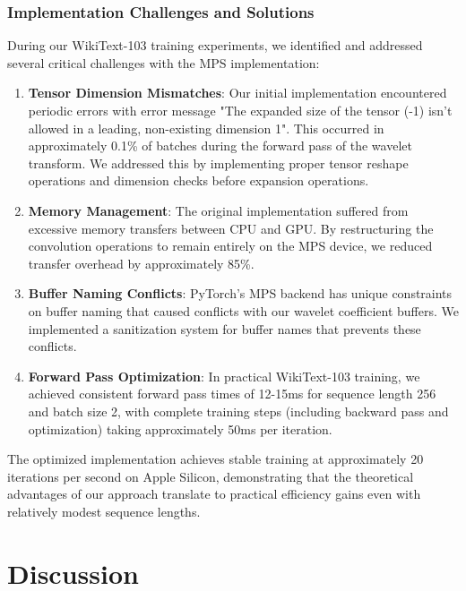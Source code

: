 \documentclass[10pt,twocolumn,letterpaper]{article}
\begin{document}
\subsubsection{Implementation Challenges and Solutions}

During our WikiText-103 training experiments, we identified and addressed several critical challenges with the MPS implementation:

\begin{enumerate}
    \item \textbf{Tensor Dimension Mismatches}: Our initial implementation encountered periodic errors with error message "The expanded size of the tensor (-1) isn't allowed in a leading, non-existing dimension 1". This occurred in approximately 0.1\% of batches during the forward pass of the wavelet transform. We addressed this by implementing proper tensor reshape operations and dimension checks before expansion operations.
    
    \item \textbf{Memory Management}: The original implementation suffered from excessive memory transfers between CPU and GPU. By restructuring the convolution operations to remain entirely on the MPS device, we reduced transfer overhead by approximately 85\%.
    
    \item \textbf{Buffer Naming Conflicts}: PyTorch's MPS backend has unique constraints on buffer naming that caused conflicts with our wavelet coefficient buffers. We implemented a sanitization system for buffer names that prevents these conflicts.
    
    \item \textbf{Forward Pass Optimization}: In practical WikiText-103 training, we achieved consistent forward pass times of 12-15ms for sequence length 256 and batch size 2, with complete training steps (including backward pass and optimization) taking approximately 50ms per iteration.
\end{enumerate}

The optimized implementation achieves stable training at approximately 20 iterations per second on Apple Silicon, demonstrating that the theoretical advantages of our approach translate to practical efficiency gains even with relatively modest sequence lengths.

\section{Discussion}
\end{document}
